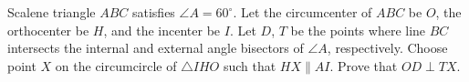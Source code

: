 Scalene triangle $ABC$ satisfies $\angle A = 60^{\circ}$. Let the circumcenter of $ABC$ be $O$, the orthocenter be $H$, and the incenter be $I$. Let $D$, $T$ be the points where line $BC$ intersects the internal and external angle bisectors of $\angle A$, respectively. Choose point $X$ on the circumcircle of $\triangle IHO$ such that $HX \parallel AI$. Prove that $OD \perp TX$.